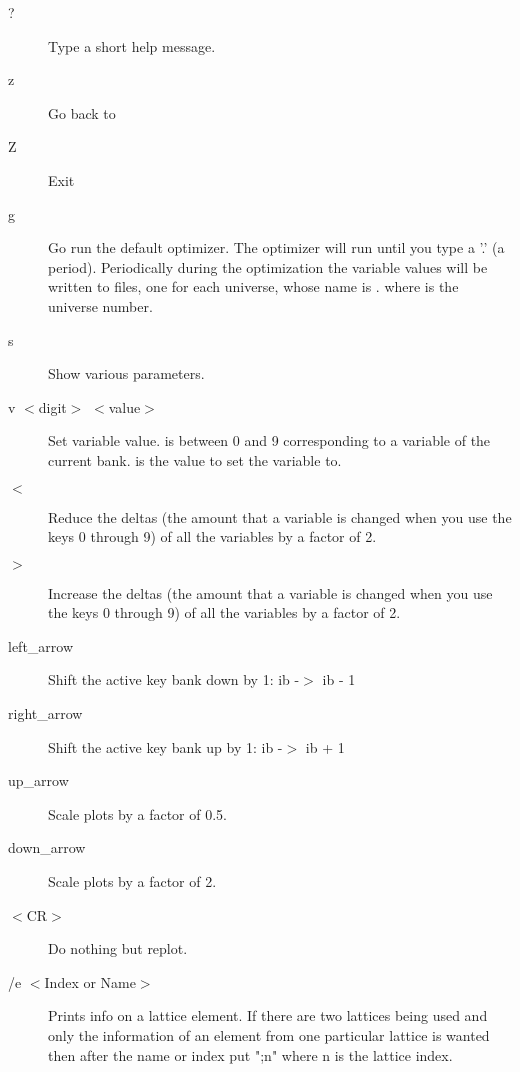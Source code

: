 \begin{description}
\item[?]
Type a short help message.

\item[z] 
Go back to 

\item[Z] 
Exit \tao
                                        
\item[g]
Go run the default optimizer. The optimizer will run until you type a
'.' (a period).  Periodically during the optimization the variable
values will be written to files, one for each universe, whose name is
. where \vn{\#} is the universe number.

\item[s]  
Show various parameters.

\item[v $<$digit$>$ $<$value$>$]
Set variable value.  is between 0 and 9 corresponding to a
variable of the current bank.  is the value to set the
variable to.

\item[$<$]
Reduce the deltas (the amount that a variable is changed when you use
the keys 0 through 9) of all the variables by a factor of 2.

\item[$>$]
Increase the deltas (the amount that a variable is changed when you
use the keys 0 through 9) of all the variables by a factor of 2.

\item[left\_arrow]
Shift the active key bank down by 1: ib -$>$ ib - 1

\item[right\_arrow]
Shift the active key bank up by 1: ib -$>$ ib + 1

\item[up\_arrow]
Scale plots by a factor of 0.5.

\item[down\_arrow]
Scale plots by a factor of 2.

\item[$<$CR$>$]
Do nothing but replot.

\item[/e $<$Index or Name$>$]
Prints info on a lattice element. If there are two lattices being used
and only the information of an element from one particular lattice is
wanted then after the name or index put ";n" where n is the lattice
index.


\end{description}
